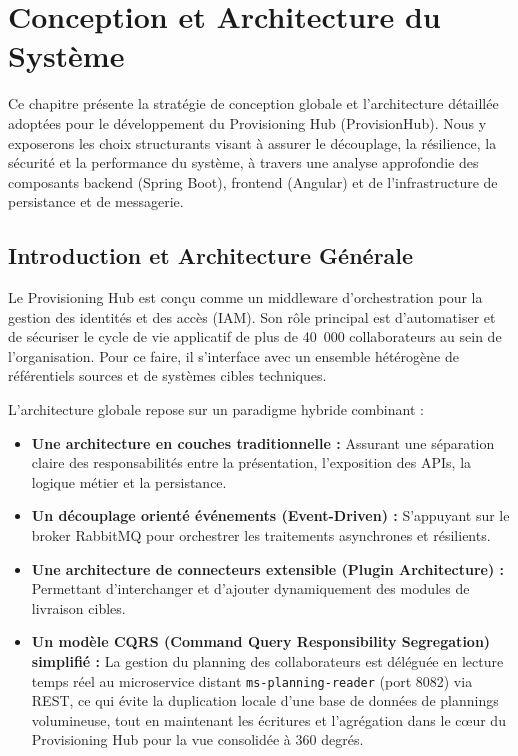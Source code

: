 \chapter{Conception et Architecture du Système}
\label{chap:conception}

Ce chapitre présente la stratégie de conception globale et l'architecture détaillée adoptées pour le développement du Provisioning Hub (ProvisionHub). Nous y exposerons les choix structurants visant à assurer le découplage, la résilience, la sécurité et la performance du système, à travers une analyse approfondie des composants backend (Spring Boot), frontend (Angular) et de l'infrastructure de persistance et de messagerie.

\section{Introduction et Architecture Générale}
Le Provisioning Hub est conçu comme un middleware d'orchestration pour la gestion des identités et des accès (IAM). Son rôle principal est d'automatiser et de sécuriser le cycle de vie applicatif de plus de 40~000 collaborateurs au sein de l'organisation. Pour ce faire, il s'interface avec un ensemble hétérogène de référentiels sources et de systèmes cibles techniques.

L'architecture globale repose sur un paradigme hybride combinant :
\begin{itemize}
    \item \textbf{Une architecture en couches traditionnelle :} Assurant une séparation claire des responsabilités entre la présentation, l'exposition des APIs, la logique métier et la persistance.
    \item \textbf{Un découplage orienté événements (Event-Driven) :} S'appuyant sur le broker RabbitMQ pour orchestrer les traitements asynchrones et résilients.
    \item \textbf{Une architecture de connecteurs extensible (Plugin Architecture) :} Permettant d'interchanger et d'ajouter dynamiquement des modules de livraison cibles.
    \item \textbf{Un modèle CQRS (Command Query Responsibility Segregation) simplifié :} La gestion du planning des collaborateurs est déléguée en lecture temps réel au microservice distant \texttt{ms-planning-reader} (port 8082) via REST, ce qui évite la duplication locale d'une base de données de plannings volumineuse, tout en maintenant les écritures et l'agrégation dans le cœur du Provisioning Hub pour la vue consolidée à 360 degrés.
\end{itemize}

